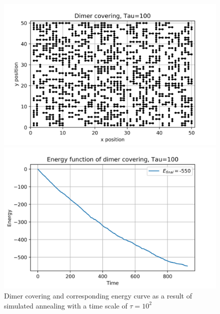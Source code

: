 \documentclass{article}
\begin{document}
\begin{figure}[H]
	\begin{minipage}{0.49\linewidth}
		\includegraphics[width=\linewidth]{../images/q4_dimers_t=1e2.png}
	\end{minipage}
	\begin{minipage}{0.49\linewidth}
		\includegraphics[width=\linewidth]{../images/q4_energy_t=1e2.png}
	\end{minipage}
	\caption{Dimer covering and corresponding energy curve as a result of simulated annealing with a time scale of $\tau = 10^2$}
	\label{fig:q4_dimers_t=1e2}
\end{figure}
\end{document}
